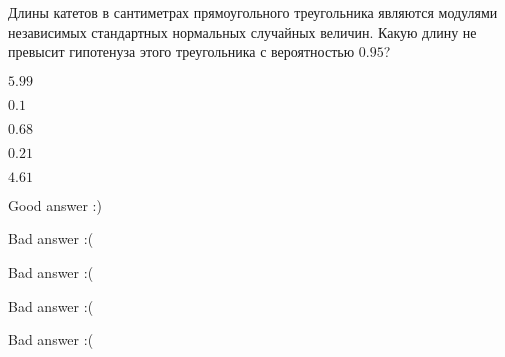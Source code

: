 
\begin{question}
Длины катетов в сантиметрах прямоугольного треугольника являются
модулями независимых стандартных нормальных случайных величин. Какую
длину не превысит гипотенуза этого треугольника с вероятностью \(0.95\)?
\begin{answerlist}
  \item \(5.99\)
  \item \(0.1\)
  \item \(0.68\)
  \item \(0.21\)
  \item \(4.61\)
\end{answerlist}
\end{question}

\begin{solution}
\begin{answerlist}
  \item Good answer :)
  \item Bad answer :(
  \item Bad answer :(
  \item Bad answer :(
  \item Bad answer :(
\end{answerlist}
\end{solution}

